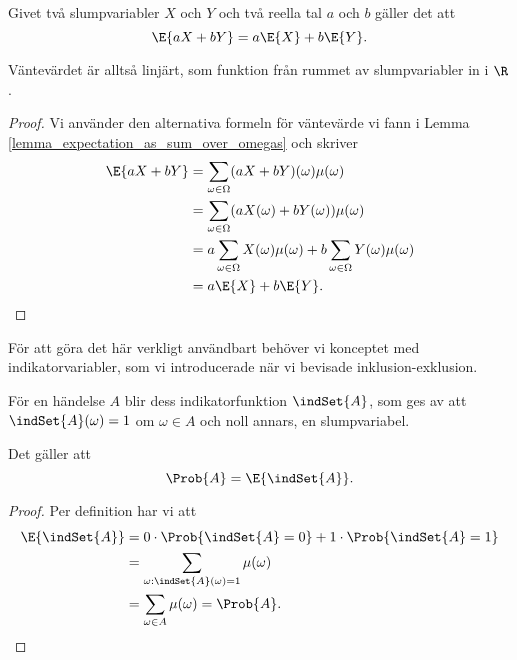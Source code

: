 \documentclass[nobib]{tufte-handout}
\begin{document}
\begin{lemma} \label{Lemma7}
    Givet två slumpvariabler $X$ och $Y$ och två reella tal $a$ och $b$ gäller det att
    $$\E{aX + bY} = a\E{X} + b\E{Y}.$$

    Väntevärdet är alltså linjärt, som funktion från rummet av slumpvariabler in i $\R$.

    \begin{proof}
        Vi använder den alternativa formeln för väntevärde vi fann i Lemma \ref{lemma_expectation_as_sum_over_omegas} och skriver
        \begin{align*}
            \E{aX + bY} &= \sum_{\omega \in \Omega} (aX + bY)(\omega)\mu(\omega)\\
            &= \sum_{\omega \in \Omega} (aX(\omega) + bY(\omega))\mu(\omega)\\
            &= a\sum_{\omega \in \Omega} X(\omega)\mu(\omega) + b\sum_{\omega \in \Omega} Y(\omega)\mu(\omega)\\
            &= a\E{X} + b\E{Y}.
        \end{align*}
    \end{proof}
\end{lemma}

För att göra det här verkligt användbart behöver vi konceptet med indikatorvariabler, som vi introducerade när vi bevisade inklusion-exklusion.

\begin{proposition}
    För en händelse $A$ blir dess indikatorfunktion $\indSet{A}$, som ges av att $\indSet{A}(\omega) = 1$ om $\omega \in A$ och noll annars, en slumpvariabel.

    Det gäller att
    $$\Prob{A} = \E{\indSet{A}}.$$

    \begin{proof}
        Per definition har vi att
        \begin{align*}
            \E{\indSet{A}} &= 0\cdot\Prob{\indSet{A} = 0} + 1\cdot\Prob{\indSet{A} = 1}\\
            &= \sum_{\omega: \indSet{A}(\omega) = 1} \mu(\omega)\\
            &= \sum_{\omega \in A} \mu(\omega) = \Prob{A}.
        \end{align*}
    \end{proof}
\end{proposition}
\end{document}
